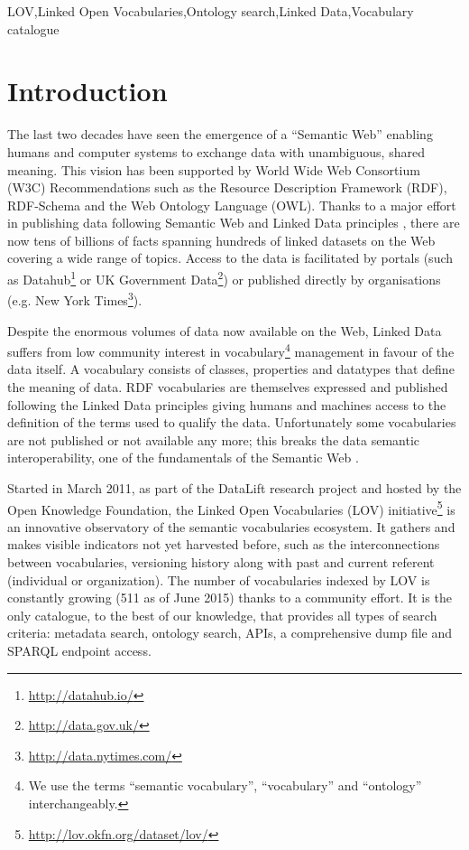 \documentclass{iosart2c}
\begin{document}
\begin{frontmatter}
\begin{keyword}
LOV\sep Linked Open Vocabularies\sep Ontology search\sep Linked Data\sep Vocabulary catalogue
\end{keyword}

\end{frontmatter}


\section{Introduction}
The last two decades have seen the emergence of a ``Semantic Web'' enabling humans and computer systems to exchange data with unambiguous, shared meaning. This vision has been supported by World Wide Web Consortium (W3C) Recommendations such as the Resource Description Framework (RDF), RDF-Schema and the Web Ontology Language (OWL). Thanks to a major effort in publishing data following Semantic Web and Linked Data principles \cite{timld}, there are now tens of billions of facts spanning hundreds of linked datasets on the Web covering a wide range of topics. Access to the data is facilitated by portals (such as Datahub\footnote{\url{http://datahub.io/}} or UK Government Data\footnote{\url{http://data.gov.uk/}}) or published directly by organisations (e.g. New York Times\footnote{\url{http://data.nytimes.com/}}). 

Despite the enormous volumes of data now available on the Web, Linked Data suffers from low community interest in vocabulary\footnote{We use the terms ``semantic vocabulary'', ``vocabulary'' and ``ontology'' interchangeably.} management in favour of the data itself. A vocabulary consists of classes, properties and datatypes that define the meaning of data. RDF vocabularies are themselves expressed and published following the Linked Data principles giving humans and machines access to the definition of the terms used to qualify the data. Unfortunately some vocabularies are not published or not available any more; this breaks the data semantic interoperability, one of the fundamentals of the Semantic Web \cite{janowicz2014five}.

Started in March 2011, as part of the DataLift research project \cite{scharffe_2012} and hosted by the Open Knowledge Foundation, the Linked Open Vocabularies (LOV) initiative\footnote{\url{http://lov.okfn.org/dataset/lov/}} is an innovative observatory of the semantic vocabularies ecosystem. It gathers and makes visible indicators not yet harvested before, such as the interconnections between vocabularies, versioning history along with past and current referent (individual or organization). The number of vocabularies indexed by LOV is constantly growing (511 as of June 2015) thanks to a community effort. It is the only catalogue, to the best of our knowledge, that provides all types of search criteria: metadata search, ontology search, APIs, a comprehensive dump file and SPARQL endpoint access. 
\end{document}
